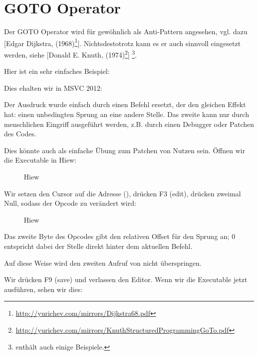 \section{GOTO Operator}

Der GOTO Operator wird für gewöhnlich als Anti-Pattern angesehen, vgl. dazu
[Edgar Dijkstra,  (1968)\footnote{\url{http://yurichev.com/mirrors/Dijkstra68.pdf}}].
Nichtsdestotrotz kann es er auch sinnvoll eingesetzt werden, siehe
[Donald E. Knuth,  (1974)\footnote{\url{http://yurichev.com/mirrors/KnuthStructuredProgrammingGoTo.pdf}}]
\footnote{\InSqBrackets{\CNotes} enthält auch einige Beispiele.}.

Hier ist ein sehr einfaches Beispiel:



Dies ehalten wir in MSVC 2012:


Der  Ausdruck wurde einfach durch einen \JMP Befehl ersetzt, der den gleichen Effekt hat: einen unbedingten Sprung an eine andere Stelle.
Das zweite \printf kann nur durch menschlichen Eingriff ausgeführt werden, z.B. durch einen Debugger oder Patchen des Codes.

\par

\clearpage
Dies könnte auch als einfache Übung zum Patchen von Nutzen sein. Öffnen wir die Executable in Hiew:

\begin{figure}[H]
\centering
{}
\caption{Hiew}
\label{fig:goto_hiew1}
\end{figure}

\clearpage
Wir setzen den Cursor auf die Adresse \JMP (), drücken F3 (edit), drücken zweimal Null, sodass der Opcode
zu  verändert wird:

\begin{figure}[H]
\centering
{}
\caption{Hiew}
\label{fig:goto_hiew2}
\end{figure}
Das zweite Byte des \JMP Opcodes gibt den relativen Offset für den Sprung an; 0 entspricht dabei der Stelle direkt
hinter dem aktuellen Befehl.

Auf diese Weise wird \JMP den zweiten Aufruf von \printf nicht überspringen.

Wir drücken F9 (save) und verlassen den Editor. Wenn wir die Executable jetzt ausführen, sehen wir dies:

